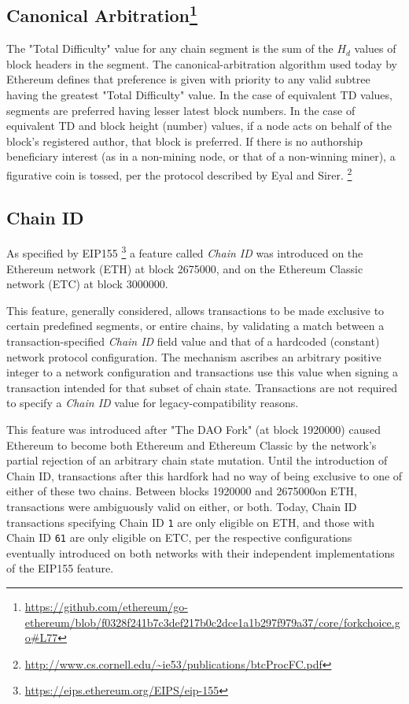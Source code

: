 \documentclass[11pt]{article}
\theoremstyle{plain}
\begin{document}
\subsection{\small{Canonical Arbitration\footnote{\url{https://github.com/ethereum/go-ethereum/blob/f0328f241b7c3def217b0c2dce1a1b297f979a37/core/forkchoice.go#L77}}}}

The "Total Difficulty" value for any chain segment is the sum of the $H_d$ 
values of block headers in the segment.
The canonical-arbitration algorithm used today by Ethereum defines
that preference is given with priority to any valid subtree having the greatest "Total Difficulty" value.
In the case of equivalent TD values, segments are preferred having lesser latest block numbers.
In the case of equivalent TD and block height (number) values, if a node acts 
on behalf of the block's registered author, that block is preferred.
If there is no authorship beneficiary interest (as in a non-mining node, or 
that of a non-winning miner), a figurative coin is tossed, per the protocol 
described by Eyal and Sirer.\nolinebreak
\footnote{\url{http://www.cs.cornell.edu/~ie53/publications/btcProcFC.pdf}}

\subsection{\small{Chain ID}}

As specified by EIP155\nolinebreak
\footnote{\url{https://eips.ethereum.org/EIPS/eip-155}} a feature called
\textit{Chain ID} was introduced on the Ethereum network (ETH) at block
2675000, and on the Ethereum Classic network (ETC) at block 3000000.

This feature, generally considered, allows transactions to be made exclusive to
certain predefined segments, or entire chains, by validating a match between a
transaction-specified \textit{Chain ID} field value and that of a hardcoded
(constant) network protocol configuration.
The mechanism ascribes an arbitrary positive integer to a network configuration
and transactions use this value when signing a transaction intended for that
subset of chain state.
Transactions are not required to specify a \textit{Chain ID} value for
legacy-compatibility reasons.

This feature was introduced after "The DAO Fork" (at block 1920000) caused
Ethereum to become both Ethereum and Ethereum Classic by the network's partial rejection of an arbitrary chain state mutation.
Until the introduction of Chain ID, transactions after this hardfork had no way
of being exclusive to one of either of these two chains.
Between blocks 1920000 and 2675000on ETH, transactions were ambiguously valid on either, or both.
Today, Chain ID transactions specifying Chain ID \texttt{1} are only eligible
on ETH, and those with Chain ID \texttt{61} are only eligible on ETC, per the
respective configurations eventually introduced on both networks with their
independent implementations of the EIP155 feature.
\end{document}
